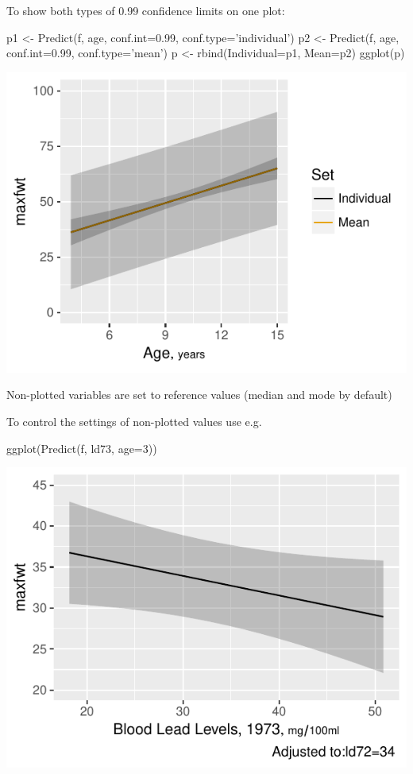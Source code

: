 \item To show both types of 0.99 confidence limits on one plot: \ipacue
\begin{Schunk}
\begin{Sinput}
p1 <- Predict(f, age, conf.int=0.99, conf.type='individual')
p2 <- Predict(f, age, conf.int=0.99, conf.type='mean')
p <- rbind(Individual=p1, Mean=p2)
ggplot(p)
\end{Sinput}


\centerline{\includegraphics[width=\maxwidth]{rmsintro-unnamed-chunk-13-1} }

\end{Schunk}
\item Non-plotted variables are set to reference values (median and
  mode by default)
\item To control the settings of non-plotted values use e.g. \ipacue
\begin{Schunk}
\begin{Sinput}
ggplot(Predict(f, ld73, age=3))
\end{Sinput}


\centerline{\includegraphics[width=\maxwidth]{rmsintro-unnamed-chunk-14-1} }

\end{Schunk}
